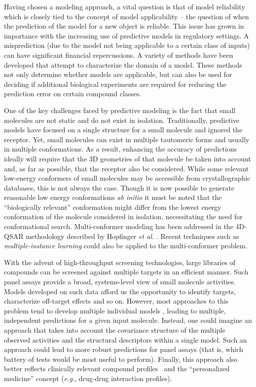 \documentclass{sig-alternate}
\begin{document}
Having chosen a modeling approach, a vital question is that of model
reliability which is closely tied to the concept of model
applicability -- the question of when the prediction of the model for
a new object is reliable. This issue has grown in importance with the
increasing use of predictive models in regulatory settings. A
misprediction (due to the model not being applicable to a certain class
of inputs) can have significant financial repercussions. A variety of
methods have been developed that attempt to characterize the domain of
a model. These methods not only determine whether models are
applicable, but can also be used for deciding if additional biological
experiments are required for reducing the prediction error on certain
compound classes.

One of the key challenges faced by predictive modeling is the fact
that small molecules are not static and do not exist in isolation.
Traditionally, predictive models have focused on a single structure
for a small molecule and ignored the receptor. Yet, small molecules
can exist in multiple tautomeric forms and usually in multiple
conformations. As a result, enhancing the accuracy of predictions
ideally will require that the 3D geometries of that molecule be taken
into account and, as far as possible, that the receptor also be
considered. While some relevant low-energy conformers of small
molecules may be accessible from crystallographic databases, this is
not always the case. Though it is now possible to generate reasonable
low energy conformations \emph{ab initio} it must be noted that the
``biologically relevant'' conformation might differ from the lowest
energy conformation of the molecule considered in isolation,
necessitating the need for conformational search.  Multi-conformer
modeling has been addressed in the 4D-QSAR methodology described by
Hopfinger \textit{et al.}  \cite{Albuquerque:1998ys}.  Recent
techniques such as \emph{multiple-instance learning} could also be
applied to the multi-conformer problem.

With the advent of high-throughput screening technologies, large
libraries of compounds can be screened against multiple targets in an
efficient manner. Such panel assays provide a broad, systems-level
view of small molecule activities.  Models developed on such data
afford us the opportunity to identify targets, characterize off-target
effects and so on. However, most approaches to this problem tend to
develop multiple individual models \cite{Chen:2010zr}, leading to
multiple, independent predictions for a given input molecule.
Instead, one could imagine an approach that takes into account the
covariance structure of the multiple observed activities and the
structural descriptors within a single model. Such an approach could
lead to more robust predictions for panel assays (that is, which
battery of tests would be most useful to perform). Finally, this
approach also better reflects clinically relevant compound
profiles~\cite{kuhn2010} and the ``personalized medicine'' concept
(\emph{e.g.}, drug-drug interaction profiles).
\end{document}
